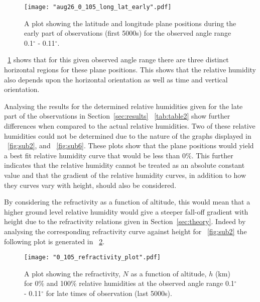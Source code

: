 \documentclass[11pt]{article}
\newcommand{\figref}[2][\figurename~]{#1\ref{#2}}
\newcommand{\tabref}[2][\tablename~]{#1\ref{#2}}
\newcommand{\secref}[2][Section~]{#1\ref{#2}}
\begin{document}
\begin{figure}[h]
\centering
\texttt{[image: "aug26\_0\_105\_long\_lat\_early".pdf]}
\caption{A plot showing the latitude and longitude plane positions during the early part of observations (first 5000s) for the observed angle range 0.1$^{\circ}$ - 0.11$^{\circ}$.}
\label{fig:long_lat_plot}
\end{figure}


\vspace{2mm}
\noindent
\figref{fig:long_lat_plot} shows that for this given observed angle range there are three distinct horizontal regions for these plane positions. This shows that the relative humidity also depends upon the horizontal orientation as well as time and vertical orientation.

\vspace{2mm}
\noindent
Analysing the results for the determined relative humidities given for the late part of the observations in \secref{sec:results} \tabref{tab:table2} show further differences when compared to the actual relative humidities. Two of these relative humidities could not be determined due to the nature of the graphs displayed in \figref{fig:sub2}, and \figref{fig:sub6}. These plots show that the plane positions would yield a best fit relative humidity curve that would be less than 0$\%$. This further indicates that the relative humidity cannot be treated as an absolute constant value and that the gradient of the relative humidity curves, in addition to how they curves vary with height, should also be considered. 


\vspace{2mm}
\noindent
By considering the refractivity as a function of altitude, this would mean that a higher ground level relative humidity would give a steeper fall-off gradient with height due to the refractivity relations given in \secref{sec:theory}. Indeed by analysing the corresponding refractivity curve against height for \figref{fig:sub2} the following plot is generated in \figref{fig:refractivity_plot}.

\begin{figure}[h]
\centering
\texttt{[image: "0\_105\_refractivity\_plot".pdf]}
\caption{A plot showing the refractivity, $N$ as a function of altitude, $h$ (km) for 0$\%$ and 100$\%$ relative humidities at the observed angle range 0.1$^{\circ}$ - 0.11$^{\circ}$ for late times of observation (last 5000s).}
\label{fig:refractivity_plot}
\end{figure}
\end{document}
